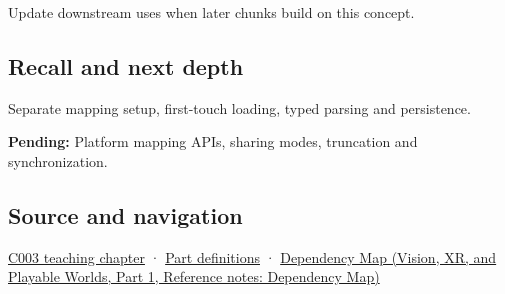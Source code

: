 \hypertarget{appendix-313ee7a0ba7b-used-by}{}

Update downstream uses when later chunks build on this concept.

\subsection{Recall and next depth}\label{appendix-313ee7a0ba7b-recall-and-next-depth}

\hypertarget{appendix-313ee7a0ba7b-recall-and-next-depth}{}

Separate mapping setup, first-touch loading, typed parsing and persistence.

\textbf{Pending:} Platform mapping APIs, sharing modes, truncation and synchronization.

\subsection{Source and navigation}\label{appendix-313ee7a0ba7b-source-and-navigation}

\hypertarget{appendix-313ee7a0ba7b-source-and-navigation}{}

\hyperref[01-foundations-i-ch002-where-the-bytes-live]{C003 teaching chapter} · \hyperref[appendix-fd090d982a15-m003---parts-41-60]{Part definitions} · \href{../07-Vision-XR-and-Playable-Worlds-P01/main.pdf\#nameddest=appendix-4ad47bdd269a}{Dependency Map (Vision, XR, and Playable Worlds, Part 1, Reference notes: Dependency Map)}
